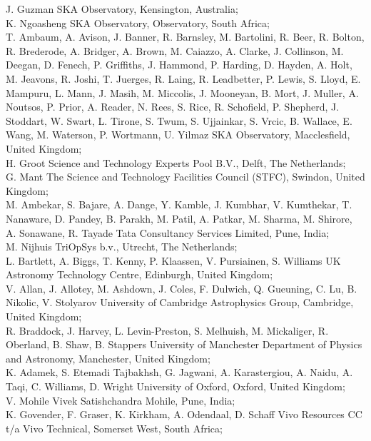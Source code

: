 {J. Guzman SKA Observatory, Kensington, Australia;\\
K. Ngoasheng SKA Observatory, Observatory, South Africa;\\
T. Ambaum,
A. Avison,
J. Banner,
R. Barnsley,
M. Bartolini,
R. Beer,
R. Bolton,
R. Brederode,
A. Bridger,
A. Brown,
M. Caiazzo,
A. Clarke,
J. Collinson,
M. Deegan,
D. Fenech,
P. Griffiths,
J. Hammond,
P. Harding,
D. Hayden,
A. Holt,
M. Jeavons,
R. Joshi,
T. Juerges,
R. Laing,
R. Leadbetter,
P. Lewis,
S. Lloyd,
E. Mampuru,
L. Mann,
J. Masih,
M. Miccolis,
J. Mooneyan,
B. Mort,
J. Muller,
A. Noutsos,
P. Prior,
A. Reader,
N. Rees,
S. Rice,
R. Schofield,
P. Shepherd,
J. Stoddart,
W. Swart,
L. Tirone,
S. Twum,
S. Ujjainkar,
S. Vrcic,
B. Wallace,
E. Wang,
M. Waterson,
P. Wortmann,
U. Yilmaz SKA Observatory, Macclesfield, United Kingdom;\\
H. Groot Science and Technology Experts Pool B.V., Delft, The Netherlands;\\
G. Mant The Science and Technology Facilities Council (STFC), Swindon, United Kingdom;\\
M. Ambekar,
S. Bajare,
A. Dange,
Y. Kamble,
J. Kumbhar,
V. Kumthekar,
T. Nanaware,
D. Pandey,
B. Parakh,
M. Patil,
A. Patkar,
M. Sharma,
M. Shirore,
A. Sonawane,
R. Tayade Tata Consultancy Services Limited, Pune, India;\\
M. Nijhuis TriOpSys b.v., Utrecht, The Netherlands;\\
L. Bartlett,
A. Biggs,
T. Kenny,
P. Klaassen,
V. Pursiainen,
S. Williams UK Astronomy Technology Centre, Edinburgh, United Kingdom;\\
V. Allan,
J. Allotey,
M. Ashdown,
J. Coles,
F. Dulwich,
Q. Gueuning,
C. Lu,
B. Nikolic,
V. Stolyarov University of Cambridge Astrophysics Group, Cambridge, United Kingdom;\\
R. Braddock,
J. Harvey,
L. Levin-Preston,
S. Melhuish,
M. Mickaliger,
R. Oberland,
B. Shaw,
B. Stappers University of Manchester Department of Physics and Astronomy, Manchester, United Kingdom;\\
K. Adamek,
S. Etemadi Tajbakhsh,
G. Jagwani,
A. Karastergiou,
A. Naidu,
A. Taqi,
C. Williams,
D. Wright University of Oxford, Oxford, United Kingdom;\\
V. Mohile Vivek Satishchandra Mohile, Pune, India;\\
K. Govender,
F. Graser,
K. Kirkham,
A. Odendaal,
D. Schaff Vivo Resources CC t/a Vivo Technical, Somerset West, South Africa;}